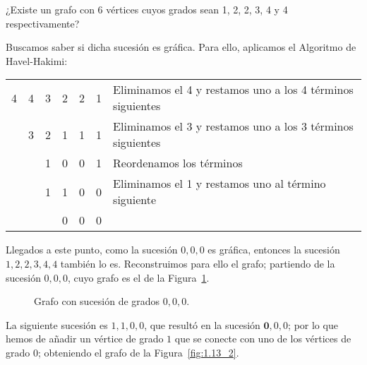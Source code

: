 \begin{ejercicio}\label{ej:1.13}
    ¿Existe un grafo con 6 vértices cuyos grados sean 1, 2, 2, 3, 4 y 4 respectivamente?

    Buscamos saber si dicha sucesión es gráfica. Para ello, aplicamos el Algoritmo de Havel-Hakimi:
    \begin{table}[H]
        \centering
        \begin{tabular}{cccccc|l}
            4 & 4 & 3 & 2 & 2 & 1 & Eliminamos el 4 y restamos uno a los 4 términos siguientes\\
              & 3 & 2 & 1 & 1 & 1 & Eliminamos el 3 y restamos uno a los 3 términos siguientes\\
              &   & 1 & 0 & 0 & 1 & Reordenamos los términos\\
              &   & 1 & 1 & 0 & 0 & Eliminamos el 1 y restamos uno al término siguiente\\
              &   &   & 0 & 0 & 0 &
        \end{tabular}
    \end{table}

    Llegados a este punto, como la sucesión $0,0,0$ es gráfica, entonces la sucesión $1,2,2,3,4,4$ también lo es. Reconstruimos para ello el grafo; partiendo de la sucesión $0,0,0$, cuyo grafo es el de la Figura~\ref{fig:1.13_1}.
    \begin{figure}
        \centering
        \caption{Grafo con sucesión de grados $0,0,0$.}
        \label{fig:1.13_1}
    \end{figure}

    La siguiente sucesión es $1,1,0,0$, que resultó en la sucesión $\textbf{0},0,0$; por lo que hemos de añadir un vértice de grado $1$ que se conecte con uno de los vértices de grado $0$; obteniendo el grafo de la Figura~\ref{fig:1.13_2}.
    \begin{figure}
        \centering
\end{figure}
\end{ejercicio}
